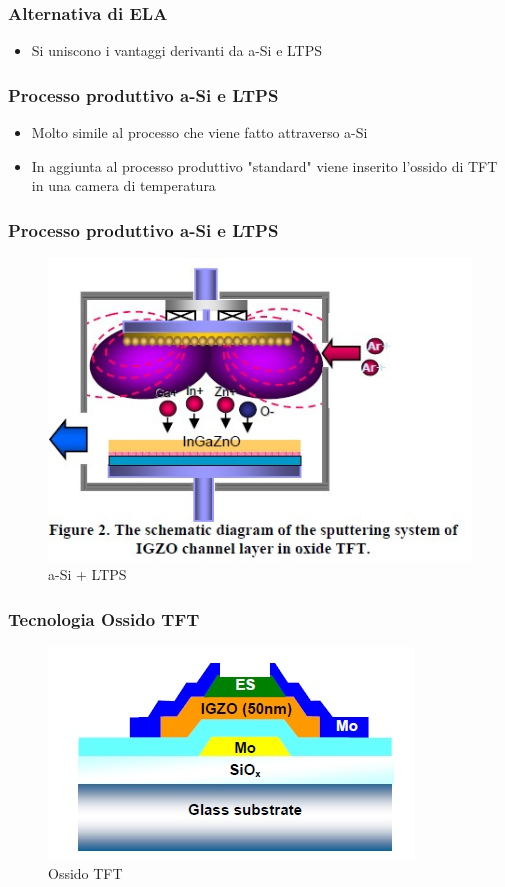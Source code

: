 \documentclass[12pt]{beamer}
\begin{document}
	\begin{frame}
		\frametitle{Alternativa di ELA}
		\begin{itemize}
			\item Si uniscono i vantaggi derivanti da a-Si e LTPS
		\end{itemize}
	\end{frame}
	\begin{frame}
		\frametitle{Processo produttivo a-Si e LTPS}
		\begin{itemize}
			\item Molto simile al processo che viene fatto attraverso a-Si
			\pause
			\item In aggiunta al processo produttivo "standard" viene inserito l'ossido di TFT in una camera di temperatura
		\end{itemize}
	\end{frame}
	\begin{frame}
		\frametitle{Processo produttivo a-Si e LTPS}
		\begin{figure}
			\centering
			\includegraphics[width=1\linewidth]{"FISICA/produzione LTPS + a-Si"}
			\caption{a-Si + LTPS}
			\label{fig:produzione-ltps--a-si}
		\end{figure}
	\end{frame}
	\begin{frame}
		\frametitle{Tecnologia Ossido TFT}
		\begin{figure}
			\centering
			\includegraphics[width=1\linewidth]{FISICA/ossidoTFT}
			\caption{Ossido TFT}
			\label{fig:ossidotft}
		\end{figure}
	\end{frame}
\end{document}

